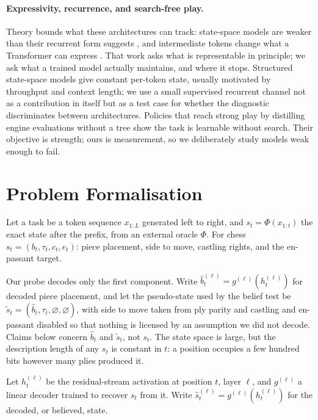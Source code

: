\documentclass[11pt]{article}
\theoremstyle{remark}
\begin{document}
\paragraph{Expressivity, recurrence, and search-free play.}
Theory bounds what these architectures can track: state-space models are weaker
than their recurrent form suggests \citep{merrill2024illusion}, and intermediate
tokens change what a Transformer can express \citep{merrill2024expressive}. That
work asks what is representable in principle; we ask what a trained model
actually maintains, and where it stops. Structured state-space models
\citep{gu2022efficiently,gu2024mamba} give constant per-token state, usually
motivated by throughput and context length; we use a small supervised recurrent
channel not as a contribution in itself but as a test case for whether the
diagnostic discriminates between architectures. Policies that reach strong play
by distilling engine evaluations without a tree \citep{ruoss2024amortized} show
the task is learnable without search. Their objective is strength; ours is
measurement, so we deliberately study models weak enough to fail.

\section{Problem Formalisation}
\label{sec:formal}

Let a task be a token sequence $x_{1:L}$ generated left to right, and
$s_t = \Phi(x_{1:t})$ the exact state after the prefix, from an external oracle
$\Phi$. For chess $s_t = (b_t, \tau_t, c_t, e_t)$: piece placement, side to move,
castling rights, and the en-passant target.

Our probe decodes only the first component. Write
$\hat{b}_t^{(\ell)} = g^{(\ell)}(h_t^{(\ell)})$ for decoded piece placement, and
let the pseudo-state used by the belief test be
$\tilde{s}_t = (\hat{b}_t, \tau_t, \varnothing, \varnothing)$, with side to move
taken from ply parity and castling and en-passant disabled so that nothing is
licensed by an assumption we did not decode. Claims below concern
$\hat{b}_t$ and $\tilde{s}_t$, not $s_t$. The state space is large, but the description length of any
$s_t$ is constant in $t$: a position occupies a few hundred bits however many
plies produced it.

Let $h_t^{(\ell)}$ be the residual-stream activation at position $t$, layer
$\ell$, and $g^{(\ell)}$ a linear decoder trained to recover $s_t$ from it. Write
$\hat{s}_t^{(\ell)} = g^{(\ell)}(h_t^{(\ell)})$ for the decoded, or believed,
state.
\end{document}
